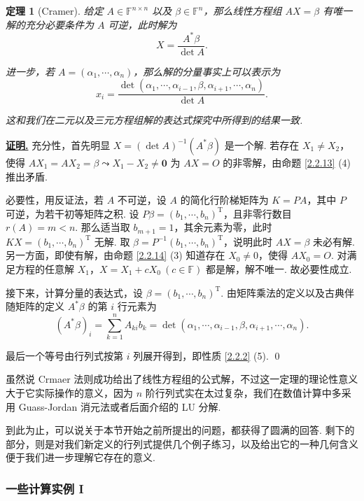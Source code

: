 \documentclass[10pt,openany]{article}
\theoremstyle{thmstyle} %
\newtheorem{theorem}{定理}[subsection]
\theoremstyle{defstyle} %
\theoremstyle{prostyle} %
\theoremstyle{exastyle}
\theoremstyle{remstyle}
\renewenvironment{proof}[1][证明]{\par\underline{\textbf{#1.}} \;\fangsong}{\qed\par}
\newcommand{\T}{^{\text{T}}}
\newcommand{\F}{\mathbb{F}}
\newcommand{\n}{^{n \times n}}
\begin{document}
\begin{theorem}[Cramer]\label{2.2.15}
	给定 \( A \in \F\n \) 以及 \( \beta \in \F^n \)，那么线性方程组 \( AX=\beta \) 有唯一解的充分必要条件为 \( A \) 可逆，此时解为
	\[ X=\frac{A^*\beta}{\det A}. \]
	
	进一步，若 \( A=(\alpha_1,\cdots,\alpha_n) \)，那么解的分量事实上可以表示为
	\[ x_i=\frac{\det(\alpha_1,\cdots,\alpha_{i-1},\beta,\alpha_{i+1},\cdots,\alpha_n)}{\det A}. \]
	
	这和我们在二元以及三元方程组解的表达式探究中所得到的结果一致.
	
\end{theorem}

\begin{proof}
	充分性，首先明显 \( X=(\det A)^{-1}(A^*\beta) \) 是一个解. 若存在 \( X_1 \neq X_2 \)，使得 \( AX_1=AX_2=\beta \leadsto X_1-X_2 \neq \bm{0} \) 为 \( AX=O \) 的非零解，由命题 \ref{2.2.13} (4) 推出矛盾. 
	
	必要性，用反证法，若 \( A \) 不可逆，设 \( A \) 的简化行阶梯矩阵为 \( K=PA \)，其中 \( P \) 可逆，为若干初等矩阵之积. 设 \( P\beta=(b_1,\cdots,b_n)\T \)，且非零行数目 \( r(A)=m<n \). 那么适当取 \( b_{m+1}=1 \)，其余元素为零，此时 \( KX=(b_1,\cdots,b_n)\T \) 无解. 取 \( \beta=P^{-1}(b_1,\cdots,b_n)\T \)，说明此时 \( AX=\beta \) 未必有解. 另一方面，即使有解，由命题 \ref{2.2.14} (3) 知道存在 \( X_0 \neq 0 \)，使得 \( AX_0=O \). 对满足方程的任意解 \( X_1 \)，\( X=X_1+cX_0 \ (c \in \F) \) 都是解，解不唯一. 故必要性成立.
	
	接下来，计算分量的表达式，设 \( \beta=(b_1,\cdots,b_n)\T \). 由矩阵乘法的定义以及古典伴随矩阵的定义 \( A^*\beta \) 的第 \( i \) 行元素为
	\[ (A^*\beta)_i=\sum_{k=1}^{n} A_{ki}b_k=\det(\alpha_1,\cdots,\alpha_{i-1},\beta,\alpha_{i+1},\cdots,\alpha_n). \]
	
	最后一个等号由行列式按第 \( i \) 列展开得到，即性质 \ref{2.2.2} (5).
\end{proof}

虽然说 Crmaer 法则成功给出了线性方程组的公式解，不过这一定理的理论性意义大于它实际操作的意义，因为 \( n \) 阶行列式实在太过复杂，我们在数值计算中多采用 Guass-Jordan 消元法或者后面介绍的 LU 分解.

到此为止，可以说关于本节开始之前所提出的问题，都获得了圆满的回答. 剩下的部分，则是对我们新定义的行列式提供几个例子练习，以及给出它的一种几何含义便于我们进一步理解它存在的意义.

\subsubsection{一些计算实例 I}
\end{document}
